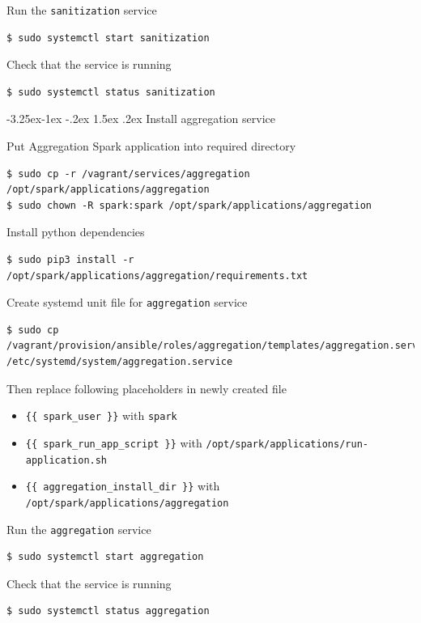 \documentclass[a4paper]{article} %
\makeatletter
\renewcommand{\normalsize}{\fontsize{12}{15}\selectfont\color{textcolor}}
\renewcommand\subsubsection{\@startsection{subsubsection}{3}{\z@}%
                   {-3.25ex\@plus -1ex \@minus -.2ex}%
                   {1.5ex \@plus .2ex}%
                   {\normalfont\normalsize\sffamily\bfseries\color{projectcolor}}}
\makeatother
\begin{document}
Run the \texttt{sanitization} service
\begin{lstlisting}
$ sudo systemctl start sanitization
\end{lstlisting}

Check that the service is running
\begin{lstlisting}
$ sudo systemctl status sanitization
\end{lstlisting}


\subsubsection{Install aggregation service}

Put Aggregation Spark application into required directory

\begin{lstlisting}
$ sudo cp -r /vagrant/services/aggregation /opt/spark/applications/aggregation
$ sudo chown -R spark:spark /opt/spark/applications/aggregation
\end{lstlisting}

Install python dependencies
\begin{lstlisting}
$ sudo pip3 install -r /opt/spark/applications/aggregation/requirements.txt
\end{lstlisting}

Create systemd unit file for \texttt{aggregation} service
\begin{lstlisting}
$ sudo cp /vagrant/provision/ansible/roles/aggregation/templates/aggregation.service.j2 /etc/systemd/system/aggregation.service
\end{lstlisting}

Then replace following placeholders in newly created file
\begin{itemize}
\item \texttt{\{\{ spark\_user \}\}} with \texttt{spark}
\item \texttt{\{\{ spark\_run\_app\_script \}\}} with \texttt{/opt/spark/applications/run-application.sh}
\item \texttt{\{\{ aggregation\_install\_dir \}\}} with \texttt{/opt/spark/applications/aggregation}
\end{itemize}

Run the \texttt{aggregation} service
\begin{lstlisting}
$ sudo systemctl start aggregation
\end{lstlisting}

Check that the service is running
\begin{lstlisting}
$ sudo systemctl status aggregation
\end{lstlisting}
\end{document}
